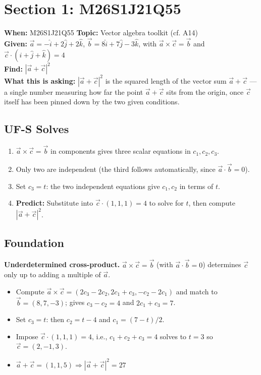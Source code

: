 \documentclass{article}
\begin{document}
\section*{Section 1: M26S1J21Q55} %

\noindent \textbf{When:} M26S1J21Q55 \quad \textbf{Topic:} Vector algebra toolkit (cf. A14) \\ %
\textbf{Given:} $\vec{a} = -\hat{i} + 2\hat{j} + 2\hat{k}$, $\vec{b} = 8\hat{i} + 7\hat{j} - 3\hat{k}$, with $\vec{a} \times \vec{c} = \vec{b}$ and $\vec{c} \cdot (\hat{i} + \hat{j} + \hat{k}) = 4$ \\ %
\textbf{Find:} $|\vec{a} + \vec{c}|^2$ \\[0.5em] %
\textbf{What this is asking:} $|\vec{a} + \vec{c}|^2$ is the squared length of the vector sum $\vec{a} + \vec{c}$ --- a single number measuring how far the point $\vec{a} + \vec{c}$ sits from the origin, once $\vec{c}$ itself has been pinned down by the two given conditions. %

\subsection*{UF-S Solves} %
\begin{enumerate}
    \item $\vec{a} \times \vec{c} = \vec{b}$ in components gives three scalar equations in $c_1, c_2, c_3$. %
    \item Only two are independent (the third follows automatically, since $\vec{a} \cdot \vec{b} = 0$). %
    \item Set $c_3 = t$: the two independent equations give $c_1, c_2$ in terms of $t$. %
    \item \textbf{Predict:} Substitute into $\vec{c} \cdot (1,1,1) = 4$ to solve for $t$, then compute $|\vec{a} + \vec{c}|^2$. %
\end{enumerate}

\subsection*{Foundation} %
\noindent \textbf{Underdetermined cross-product.} $\vec{a} \times \vec{c} = \vec{b}$ (with $\vec{a} \cdot \vec{b} = 0$) determines $\vec{c}$ only up to adding a multiple of $\vec{a}$. %
\begin{itemize}
    \item Compute $\vec{a} \times \vec{c} = (2c_3 - 2c_2, 2c_1 + c_3, -c_2 - 2c_1)$ and match to $\vec{b} = (8,7,-3)$; gives $c_3 - c_2 = 4$ and $2c_1 + c_3 = 7$. %
    \item Set $c_3 = t$: then $c_2 = t - 4$ and $c_1 = (7 - t)/2$. %
    \item Impose $\vec{c} \cdot (1,1,1) = 4$, i.e., $c_1 + c_2 + c_3 = 4$ solves to $t = 3$ so $\vec{c} = (2,-1,3)$. %
    \item $\vec{a} + \vec{c} = (1,1,5) \Rightarrow \boxed{|\vec{a} + \vec{c}|^2 = 27}$ %
\end{itemize}
\end{document}
